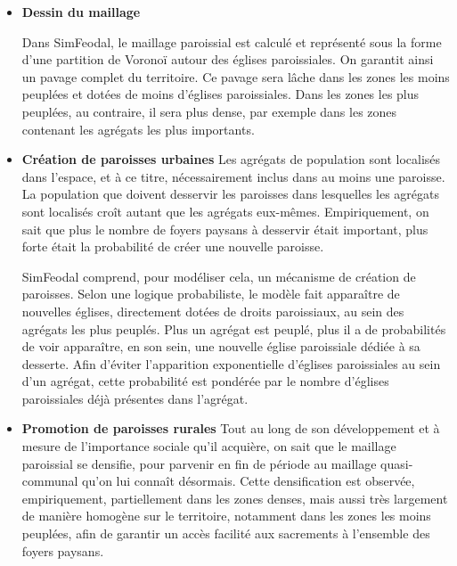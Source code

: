 \begin{itemize}
	\item \textbf{Dessin du maillage}
		\begin{tcolorbox}[breakable,left=0pt,right=0pt,top=0pt,bottom=0pt,
		colback=gray!15,colframe=gray!15,width=\dimexpr0.94\textwidth\relax, 
		enlarge left by=0mm, boxsep=5pt,arc=0pt,outer arc=0pt]
			Dans SimFeodal, le maillage paroissial est calculé et représenté sous la forme d'une partition de Voronoï autour des églises paroissiales.
			On garantit ainsi un pavage complet du territoire.
			Ce pavage sera lâche dans les zones les moins peuplées et dotées de 	moins d'églises paroissiales.
			Dans les zones les plus peuplées, au contraire, il sera plus dense, par exemple dans les zones contenant les agrégats les plus importants.
	\end{tcolorbox}
	
	\item \textbf{Création de paroisses \og urbaines\fg{}} Les agrégats de population sont localisés dans l'espace, et à ce titre, nécessairement inclus dans au moins une paroisse.
	La population que doivent desservir les paroisses dans lesquelles les agrégats sont localisés croît autant que les agrégats eux-mêmes.
	Empiriquement, on sait que plus le nombre de foyers paysans à desservir était important, plus forte était la probabilité de créer une nouvelle paroisse.
	
	\begin{tcolorbox}[breakable,left=0pt,right=0pt,top=0pt,bottom=0pt,
		colback=gray!15,colframe=gray!15,width=\dimexpr0.94\textwidth\relax, 
		enlarge left by=0mm, boxsep=5pt,arc=0pt,outer arc=0pt]
	SimFeodal comprend, pour modéliser cela, un mécanisme de création de paroisses.
	Selon une logique probabiliste, le modèle fait apparaître de nouvelles églises, directement dotées de droits paroissiaux, au sein des agrégats les plus peuplés.
	Plus un agrégat est peuplé, plus il a de probabilités de voir apparaître, en son sein, une nouvelle église paroissiale dédiée à sa desserte.	
	Afin d'éviter l'apparition exponentielle d'églises paroissiales au sein d'un agrégat, cette probabilité est pondérée par le nombre d'églises paroissiales déjà présentes dans l'agrégat.
\end{tcolorbox}
	
	\item \textbf{Promotion de paroisses \og rurales\fg{}} Tout au long de son développement et à mesure de l'importance sociale qu'il acquière, on sait que le maillage paroissial se densifie, pour parvenir en fin de période au maillage quasi-communal qu'on lui connaît désormais.
	Cette densification est observée, empiriquement, partiellement dans les zones denses, mais aussi très largement de manière homogène sur le territoire, notamment dans les zones les moins peuplées, afin de garantir un accès facilité aux sacrements à l'ensemble des foyers paysans.
	

\end{itemize}
